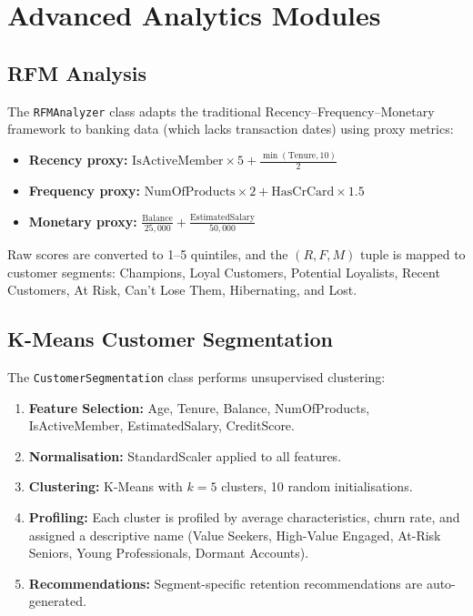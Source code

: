 \documentclass[12pt, a4paper]{report}
\begin{document}
\chapter{Advanced Analytics Modules}

\section{RFM Analysis}

The \texttt{RFMAnalyzer} class adapts the traditional Recency--Frequency--Monetary framework to banking data (which lacks transaction dates) using proxy metrics:

\begin{itemize}
    \item \textbf{Recency proxy:} $\text{IsActiveMember} \times 5 + \frac{\min(\text{Tenure}, 10)}{2}$
    \item \textbf{Frequency proxy:} $\text{NumOfProducts} \times 2 + \text{HasCrCard} \times 1.5$
    \item \textbf{Monetary proxy:} $\frac{\text{Balance}}{25{,}000} + \frac{\text{EstimatedSalary}}{50{,}000}$
\end{itemize}

Raw scores are converted to 1--5 quintiles, and the $(R, F, M)$ tuple is mapped to customer segments: Champions, Loyal Customers, Potential Loyalists, Recent Customers, At Risk, Can't Lose Them, Hibernating, and Lost.

\section{K-Means Customer Segmentation}

The \texttt{CustomerSegmentation} class performs unsupervised clustering:

\begin{enumerate}
    \item \textbf{Feature Selection:} Age, Tenure, Balance, NumOfProducts, IsActiveMember, EstimatedSalary, CreditScore.
    \item \textbf{Normalisation:} StandardScaler applied to all features.
    \item \textbf{Clustering:} K-Means with $k=5$ clusters, 10 random initialisations.
    \item \textbf{Profiling:} Each cluster is profiled by average characteristics, churn rate, and assigned a descriptive name (Value Seekers, High-Value Engaged, At-Risk Seniors, Young Professionals, Dormant Accounts).
    \item \textbf{Recommendations:} Segment-specific retention recommendations are auto-generated.
\end{enumerate}
\end{document}
